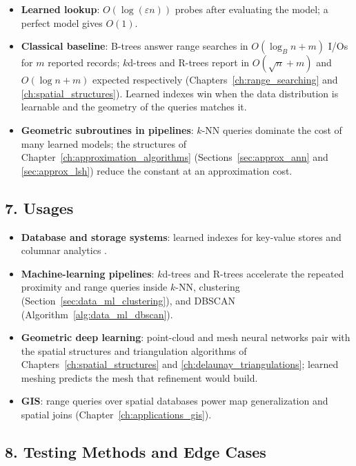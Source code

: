 \begin{itemize}
\item \textbf{Learned lookup}: $O(\log(\varepsilon n))$ probes after
  evaluating the model; a perfect model gives $O(1)$.
\item \textbf{Classical baseline}: B-trees answer range searches in
  $O(\log_B n + m)$ I/Os for $m$ reported records; $k$d-trees and R-trees
  report in $O(\sqrt{n} + m)$ and $O(\log n + m)$ expected respectively
  (Chapters~\ref{ch:range_searching} and \ref{ch:spatial_structures}).
  Learned indexes win when the data distribution is learnable and the
  geometry of the queries matches it.
\item \textbf{Geometric subroutines in pipelines}: $k$-NN queries dominate
  the cost of many learned models; the structures of
  Chapter~\ref{ch:approximation_algorithms}
  (Sections~\ref{sec:approx_ann} and \ref{sec:approx_lsh}) reduce the
  constant at an approximation cost.
\end{itemize}

\subsection{7. Usages}

\begin{itemize}
\item \textbf{Database and storage systems}: learned indexes for key-value
  stores and columnar analytics \cite{kraska2018}.
\item \textbf{Machine-learning pipelines}: $k$d-trees and R-trees accelerate
  the repeated proximity and range queries inside $k$-NN, clustering
  (Section~\ref{sec:data_ml_clustering}), and DBSCAN
  (Algorithm~\ref{alg:data_ml_dbscan}).
\item \textbf{Geometric deep learning}: point-cloud and mesh neural
  networks pair with the spatial structures and triangulation algorithms of
  Chapters~\ref{ch:spatial_structures} and \ref{ch:delaunay_triangulations};
  learned meshing predicts the mesh that refinement would build.
\item \textbf{GIS}: range queries over spatial databases power map
  generalization and spatial joins (Chapter~\ref{ch:applications_gis}).
\end{itemize}

\subsection{8. Testing Methods and Edge Cases}

